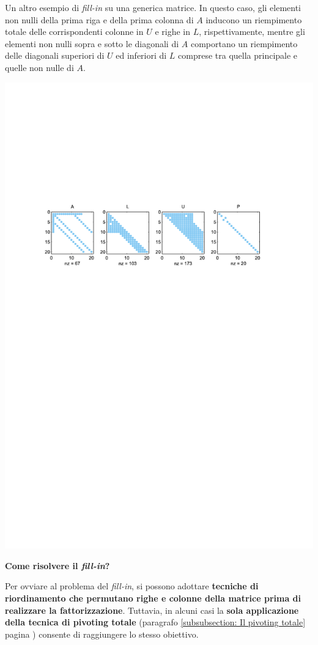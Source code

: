 \begin{examplebox}
    Un altro esempio di \emph{fill-in} su una generica matrice. In questo caso, gli elementi non nulli della prima riga e della prima colonna di $A$ inducono un riempimento totale delle corrispondenti colonne in $U$ e righe in $L$, rispettivamente, mentre gli elementi non nulli sopra e sotto le diagonali di $A$ comportano un riempimento delle diagonali superiori di $U$ ed inferiori di $L$ comprese tra quella principale e quelle non nulle di $A$.

    \highspace
    \centering
    \includegraphics[width=\textwidth]{img/fill_in_2.pdf}
\end{examplebox}

\begin{flushleft}
    \textcolor{Green3}{ \textbf{Come risolvere il \emph{fill-in}?}}
\end{flushleft}
Per ovviare al problema del \emph{fill-in}, si possono adottare \textbf{tecniche di riordinamento che permutano righe e colonne della matrice prima di realizzare la fattorizzazione}. Tuttavia, in alcuni casi la \textbf{sola applicazione della tecnica di pivoting totale} (paragrafo \ref{subsubsection: Il pivoting totale} pagina \pageref{subsubsection: Il pivoting totale}) consente di raggiungere lo stesso obiettivo.

